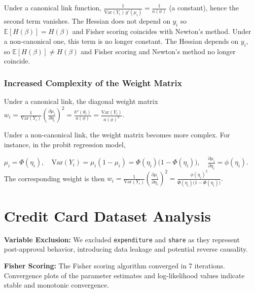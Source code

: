 \documentclass[11pt]{article}
\newcommand{\derivstep}[1]{%
  \par\medskip\noindent #1%
}
\begin{document}
\derivstep{Under a canonical link function, } $\frac{1}{\mathrm{Var}(Y_i)\, g'(\mu_i)} = \frac{1}{a(\phi)}$ (a constant), hence the second term vanishes. The Hessian does not depend on $y_i$ so 
$\mathbb{E}\!\left[ H(\beta) \right] = H(\beta)$ and Fisher scoring coincides with Newton's method. Under a non-canonical one, this term is no longer constant. The Hessian depends on $y_i$, so $\mathbb{E}\!\left[ H(\beta) \right] \neq H(\beta)$ and Fisher scoring and Newton's method no longer coincide.

\subsubsection{Increased Complexity of the Weight Matrix}
Under a canonical link, the diagonal weight matrix $w_i
= \frac{1}{\mathrm{Var}(Y_i)}
\left( \frac{\partial \mu_i}{\partial \eta_i} \right)^2
= \frac{b''(\theta_i)}{a(\phi)}
= \frac{\mathrm{Var}(Y_i)}{a(\phi)^2}.
$
\derivstep{Under a non-canonical link, the weight matrix becomes more complex. For instance, in the probit regression model,}
$
\mu_i = \Phi(\eta_i), \quad \mathrm{Var}(Y_i) = \mu_i(1-\mu_i) = \Phi(\eta_i)\bigl(1-\Phi(\eta_i)\bigr), \quad \frac{\partial \mu_i}{\partial \eta_i} = \phi(\eta_i)
$.
The corresponding weight is then
$
w_i
= \frac{1}{\mathrm{Var}(Y_i)}
\left( \frac{\partial \mu_i}{\partial \eta_i} \right)^2
= \frac{\phi(\eta_i)^2}{\Phi(\eta_i)\bigl(1-\Phi(\eta_i)\bigr)}.
$

\section{Credit Card Dataset Analysis}
\textbf{Variable Exclusion:} We excluded \texttt{expenditure} and \texttt{share} as they represent post-approval behavior, introducing data leakage and potential reverse causality.
\derivstep{\textbf{Fisher Scoring:}
The Fisher scoring algorithm converged in 7 iterations. Convergence plots of the parameter estimates and log-likelihood values indicate stable and monotonic convergence.}
\end{document}
